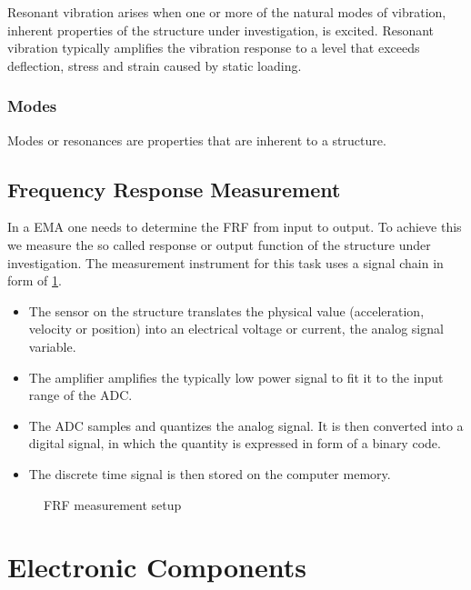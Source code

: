 Resonant vibration arises when one or more of the natural modes of vibration, inherent properties of the structure under investigation, is excited. Resonant vibration typically amplifies the vibration response to a level that exceeds deflection, stress and strain caused by static loading. 

\subsubsection{Modes}

Modes or resonances are properties that are inherent to a structure. 

\subsection{Frequency Response Measurement}

In a \ac{EMA} one needs to determine the \ac{FRF} from input to output. To achieve this we measure the so called response or output function of the structure under investigation. The measurement instrument for this task uses a signal chain in form of \ref{fig:measurment}.
\begin{itemize}
    \item The sensor on the structure translates the physical value (acceleration, velocity or position) into an electrical voltage or current, the analog signal variable.
    \item The amplifier amplifies the typically low power signal to fit it to the input range of the \ac{ADC}.
    \item The \ac{ADC} samples and quantizes the analog signal. It is then converted into a digital signal, in which the quantity is expressed in form of a binary code.
    \item The discrete time signal is then stored on the computer memory.
\end{itemize}
\cite{fu2001modal}

\begin{figure}[!htb]
    \centering
    
    \caption[Frequency Response Measurement]{\ac{FRF} measurement setup}
    \label{fig:measurment}
\end{figure}

\section{Electronic Components}

